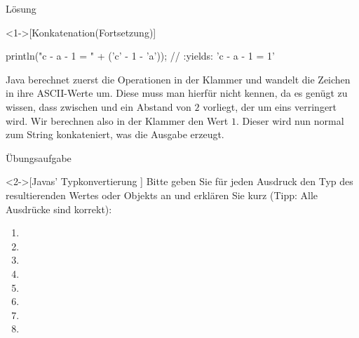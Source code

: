 \begin{frame}[c,fragile]{Lösung}
    \addtocounter{solve}{-1}
    \begin{solve}<1->[Konkatenation\hfill(Fortsetzung)]
\pause{}
\begin{plainjava}
println("c - a - 1 = " + ('c' - 1 - 'a'));
    // :yields: 'c - a - 1 = 1'
\end{plainjava}
    \pause{}Java berechnet zuerst die Operationen in der Klammer und wandelt die Zeichen in ihre ASCII-Werte um.\pause{} Diese muss man hierfür nicht kennen,\pause{} da es genügt zu wissen, dass zwischen  und  ein Abstand von \(2\) vorliegt, der um eins verringert wird.\pause{}
    Wir berechnen also in der Klammer den Wert \(1\).\pause{} Dieser wird nun normal zum String konkateniert, was die Ausgabe erzeugt.
    \end{solve}
\end{frame}

\begin{frame}[c]{Übungsaufgabe}
    \begin{exercise}<2->[Javas' Typkonvertierung ]
        \pause{}\pause{}Bitte geben Sie für jeden Ausdruck den Typ des resultierenden Wertes oder Objekts an und erklären Sie kurz\pause{} (Tipp: Alle Ausdrücke sind korrekt):\pause
\begin{multicols}{2}
    \begin{enumerate}
        \item {}
        \item {}
        \item {}
        \item {}
        \item {}
        \item {}
        \item {}
        \item {}
    \end{enumerate}
\end{multicols}
    \end{exercise}
\end{frame}

